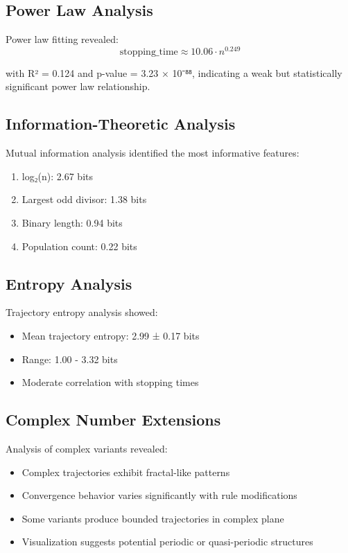 \documentclass[12pt,a4paper]{article}
\begin{document}
\subsection{Power Law Analysis}

Power law fitting revealed:
\begin{equation}
\text{stopping\_time} \approx 10.06 \cdot n^{0.249}
\end{equation}

with R² = 0.124 and p-value = 3.23 × 10⁻⁸⁸, indicating a weak but statistically significant power law relationship.

\subsection{Information-Theoretic Analysis}

Mutual information analysis identified the most informative features:
\begin{enumerate}
\item log₂(n): 2.67 bits
\item Largest odd divisor: 1.38 bits
\item Binary length: 0.94 bits
\item Population count: 0.22 bits
\end{enumerate}

\subsection{Entropy Analysis}

Trajectory entropy analysis showed:
\begin{itemize}
\item Mean trajectory entropy: 2.99 ± 0.17 bits
\item Range: 1.00 - 3.32 bits
\item Moderate correlation with stopping times
\end{itemize}

\subsection{Complex Number Extensions}

Analysis of complex variants revealed:
\begin{itemize}
\item Complex trajectories exhibit fractal-like patterns
\item Convergence behavior varies significantly with rule modifications
\item Some variants produce bounded trajectories in complex plane
\item Visualization suggests potential periodic or quasi-periodic structures
\end{itemize}
\end{document}
